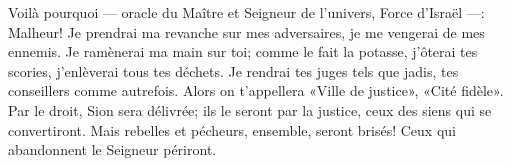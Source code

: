 Voilà pourquoi --- oracle du Maître et Seigneur de l’univers, Force d’Israël ---:
	Malheur!
	Je prendrai ma revanche sur mes adversaires, je me vengerai de mes ennemis.
Je ramènerai ma main sur toi;
	comme le fait la potasse, j’ôterai tes scories,
	j’enlèverai tous tes déchets.
Je rendrai tes juges tels que jadis, tes conseillers comme autrefois.
	Alors on t’appellera «Ville de justice», «Cité fidèle».
Par le droit, Sion sera délivrée;
	ils le seront par la justice, ceux des siens qui se convertiront.
Mais rebelles et pécheurs, ensemble, seront brisés!
	Ceux qui abandonnent le Seigneur périront.
